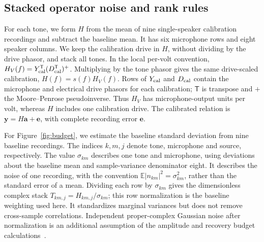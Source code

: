 \documentclass[lineno,pdflatex,sn-nature]{sn-jnl}%
\theoremstyle{thmstyleone}%
\theoremstyle{thmstyletwo}%
\theoremstyle{thmstylethree}%
\begin{document}
\subsection{Stacked operator noise and rank rules}

For each tone, we form $H$ from the mean of nine single-speaker calibration recordings and subtract the baseline mean. It has six microphone rows and eight speaker columns. We keep the calibration drive in $H$, without dividing by the drive phasor, and stack all tones. In the local per-volt convention, $H_V(f)=Y_{\rm cal}^{\mathsf T}(D_{\rm cal}^{\mathsf T})^+$. Multiplying by the tone phasor gives the same drive-scaled calibration, $H(f)=s(f)H_V(f)$. Rows of $Y_{\rm cal}$ and $D_{\rm cal}$ contain the microphone and electrical drive phasors for each calibration; $\mathsf T$ is transpose and $+$ the Moore--Penrose pseudoinverse. Thus $H_V$ has microphone-output units per volt, whereas $H$ includes one calibration drive. The calibrated relation is $\mathbf y=H\mathbf a+\mathbf e$, with complete recording error $\mathbf e$.


For Figure~\ref{fig:budget}, we estimate the baseline standard deviation from nine baseline recordings. The indices $k,m,j$ denote tone, microphone and source, respectively. The value $\sigma_{km}$ describes one tone and microphone, using deviations about the baseline mean and sample-variance denominator eight. It describes the noise of one recording, with the convention $\mathbb E|n_{km}|^2=\sigma_{km}^2$, rather than the standard error of a mean. Dividing each row by $\sigma_{km}$ gives the dimensionless complex stack $T_{km,j}=H_{km,j}/\sigma_{km}$; this row normalization is the baseline weighting used here. It standardizes marginal variances but does not remove cross-sample correlations. Independent proper-complex Gaussian noise after normalization is an additional assumption of the amplitude and recovery budget calculations~\cite{schreier2010}.
\end{document}
